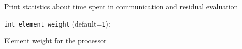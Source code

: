Print statistics about time spent in communication and residual evaluation

\item\verb+int element_weight+ {\rm(default=\verb|1|)}:

Element weight for the processor

